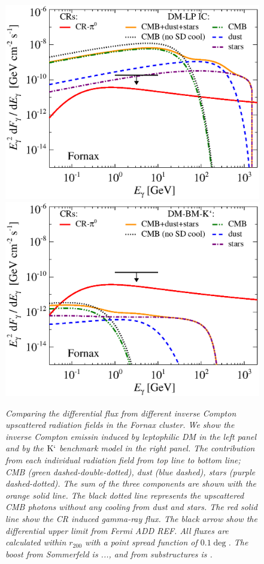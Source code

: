 \documentclass[10pt,aps,pra,reprint,amsmath,amsfonts,amssymb,showpacs]{revtex4-1}
\newcommand{\rmn}{\mathrm}
\newcommand{\rvir}{r_{200}}
\newcommand{\Km}{\rmn{K}`}
\begin{document}
\begin{figure}
\begin{minipage}{2.0\columnwidth}
\includegraphics[width=0.49\columnwidth]{figures/flux.IRcomp.v8.0.1deg.1.6T.SubMass.elmu.SF300.noMW.woGal.eps}
\includegraphics[width=0.49\columnwidth]{figures/flux.IRcomp.BMv8.0.1deg.SubMass.noMW.woGal.eps}
\caption{\it Comparing the differential flux from different inverse
  Compton upscattered radiation fields in the Fornax cluster. We show
  the inverse Compton emissin induced by leptophilic DM in the left
  panel and by the $\Km$ benchmark model in the right panel. The
  contribution from each individual radiation field from top line to
  bottom line; CMB (green dashed-double-dotted), dust (blue dashed),
  stars (purple dashed-dotted). The sum of the three components are
  shown with the orange solid line. The black dotted line represents
  the upscattered CMB photons without any cooling from dust and
  stars. The red solid line show the CR induced gamma-ray flux. The
  black arrow show the differential upper limit from Fermi ADD
  REF. All fluxes are calculated within $\rvir$ with a point spread
  function of $0.1\deg$. The boost from Sommerfeld is ..., and from
  substructures is .}
 \label{fig6}
\end{minipage}
\end{figure}
\end{document}

